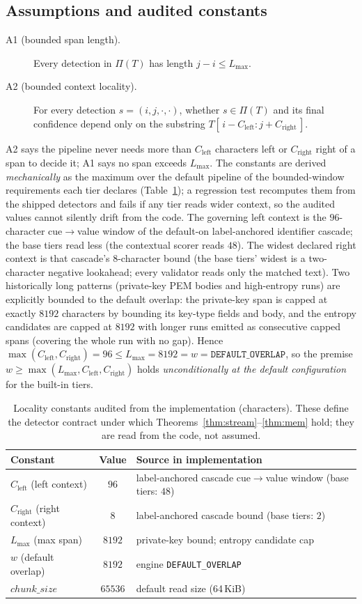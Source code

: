 \documentclass[runningheads]{llncs}
\newcommand{\T}{T}
\newcommand{\Pipe}{\Pi}
\newcommand{\Lmax}{L_{\max}}
\newcommand{\Cleft}{C_{\mathrm{left}}}
\newcommand{\Cright}{C_{\mathrm{right}}}
\begin{document}
\subsection{Assumptions and audited constants}
\begin{description}
\item[A1 (bounded span length).] Every detection in $\Pipe(\T)$ has length
$j-i \le \Lmax$.
\item[A2 (bounded context locality).] For every detection $s=(i,j,\cdot,\cdot)$,
whether $s\in\Pipe(\T)$ and its final confidence depend only on the substring
$\T[\,i-\Cleft : j+\Cright\,]$.
\end{description}
A2 says the pipeline never needs more than $\Cleft$ characters left or $\Cright$
right of a span to decide it; A1 says no span exceeds $\Lmax$. The constants are
derived \emph{mechanically} as the maximum over the default pipeline of the
bounded-window requirements each tier declares (Table~\ref{tab:constants}); a
regression test recomputes them from the shipped detectors and fails if any tier
reads wider context, so the audited values cannot silently drift from the code.
The governing left context is the $96$-character cue$\rightarrow$value window of
the default-on label-anchored identifier cascade; the base tiers read less (the
contextual scorer reads $48$). The widest declared right context is that
cascade's $8$-character bound (the base tiers' widest is a two-character negative
lookahead; every validator reads only the matched text). Two historically long
patterns (private-key PEM bodies and high-entropy runs) are explicitly bounded to
the default overlap: the private-key span is capped at exactly $8192$ characters
by bounding its key-type fields and body, and the entropy candidates are capped
at $8192$ with longer runs emitted as consecutive capped spans (covering the
whole run with no gap). Hence $\max(\Cleft,\Cright)=96 \le \Lmax = 8192 = w =
\texttt{DEFAULT\_OVERLAP}$, so the premise $w\ge\max(\Lmax,\Cleft,\Cright)$ holds
\emph{unconditionally at the default configuration} for the built-in tiers.

\begin{table}[t]
\centering
\caption{Locality constants audited from the implementation (characters). These
define the detector contract under which Theorems~\ref{thm:stream}--\ref{thm:mem}
hold; they are read from the code, not assumed.}
\label{tab:constants}
\begin{tabular}{@{}lcl@{}}
\toprule
Constant & Value & Source in implementation \\
\midrule
$\Cleft$ (left context) & $96$ & label-anchored cascade cue$\rightarrow$value window (base tiers: $48$) \\
$\Cright$ (right context) & $8$ & label-anchored cascade bound (base tiers: $2$) \\
$\Lmax$ (max span) & $8192$ & private-key bound; entropy candidate cap \\
$w$ (default overlap) & $8192$ & engine \texttt{DEFAULT\_OVERLAP} \\
$\mathit{chunk\_size}$ & $65536$ & default read size (64\,KiB) \\
\bottomrule
\end{tabular}
\end{table}
\end{document}
